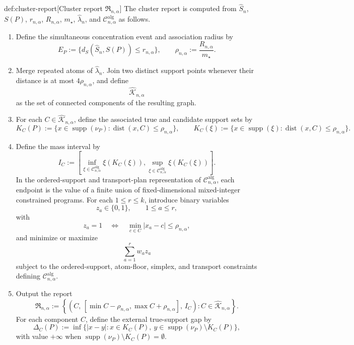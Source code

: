 \documentclass[11pt]{article}
\begin{document}
\begin{algorithmv}{def:cluster-report}[Cluster report \(\mathfrak R_{n,\alpha}\)]
The cluster report is computed from \(\widehat S_n\), \(S(P)\), \(r_{n,\alpha}\), \(R_{n,\alpha}\), \(m_\star\), \(\widehat\lambda_n\), and \(\mathcal C^{\mathrm{alg}}_{n,\alpha}\) as follows.
\begin{enumerate}
\item Define the simultaneous concentration event and association radius by
\[
E_P:=\{d_S(\widehat S_n,S(P))\le r_{n,\alpha}\},
\qquad
\rho_{n,\alpha}:=\frac{R_{n,\alpha}}{m_\star}.
\]
\item Merge repeated atoms of \(\widehat\lambda_n\). Join two distinct support points whenever their distance is at most \(4\rho_{n,\alpha}\), and define
\[
\widehat{\mathscr K}_{n,\alpha}
\]
as the set of connected components of the resulting graph.
\item For each \(C\in\widehat{\mathscr K}_{n,\alpha}\), define the associated true and candidate support sets by
\[
K_C(P):=\{x\in\operatorname{supp}(\nu_P):\operatorname{dist}(x,C)\le\rho_{n,\alpha}\},
\qquad
K_C(\xi):=\{x\in\operatorname{supp}(\xi):\operatorname{dist}(x,C)\le\rho_{n,\alpha}\}.
\]
\item Define the mass interval by
\[
I_C:=\left[
\inf_{\xi\in\mathcal C^{\mathrm{alg}}_{n,\alpha}}\xi(K_C(\xi)),
\sup_{\xi\in\mathcal C^{\mathrm{alg}}_{n,\alpha}}\xi(K_C(\xi))
\right].
\]
In the ordered-support and transport-plan representation of \(\mathcal C^{\mathrm{alg}}_{n,\alpha}\), each endpoint is the value of a finite union of fixed-dimensional mixed-integer constrained programs. For each \(1\le r\le k\), introduce binary variables
\[
z_a\in\{0,1\},\qquad 1\le a\le r,
\]
with
\[
z_a=1\quad\Longleftrightarrow\quad \min_{c\in C}|x_a-c|\le\rho_{n,\alpha},
\]
and minimize or maximize
\[
\sum_{a=1}^r w_a z_a
\]
subject to the ordered-support, atom-floor, simplex, and transport constraints defining \(\mathcal C^{\mathrm{alg}}_{n,\alpha}\).
\item Output the report
\[
\mathfrak R_{n,\alpha}
:=
\left\{
\left(
C,\,
[\min C-\rho_{n,\alpha},\max C+\rho_{n,\alpha}],\,
I_C
\right):
C\in\widehat{\mathscr K}_{n,\alpha}
\right\}.
\]
For each component \(C\), define the external true-support gap by
\[
\Delta_C(P):=\inf\{|x-y|:x\in K_C(P),\ y\in\operatorname{supp}(\nu_P)\setminus K_C(P)\},
\]
with value \(+\infty\) when \(\operatorname{supp}(\nu_P)\setminus K_C(P)=\emptyset\).
\end{enumerate}
\end{algorithmv}
\end{document}
